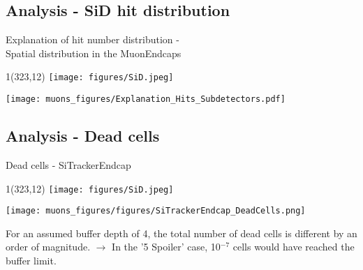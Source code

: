 \documentclass[xcolor={dvipsnames}]{beamer}
\newcommand{\sidlogo}{
  \setlength{\TPHorizModule}{1pt}
  \setlength{\TPVertModule}{1pt}
  \begin{textblock}{1}(323,12)
   \texttt{[image: figures/SiD.jpeg]}
  \end{textblock}
  }
\begin{document}
\subsection{Analysis - SiD hit distribution}
\begin{frame}{Explanation of hit number distribution -\\ \small Spatial distribution in the MuonEndcaps}
\sidlogo
 \begin{center}
\texttt{[image: muons\_figures/Explanation\_Hits\_Subdetectors.pdf]}
\end{center}
\end{frame}

\subsection{Analysis - Dead cells}
\begin{frame}{Dead cells - \small SiTrackerEndcap}
\sidlogo
 \begin{center}
\texttt{[image: muons\_figures/figures/SiTrackerEndcap\_DeadCells.png]}
\end{center}
\small For an assumed buffer depth of 4, the total number of dead cells is different by an order of magnitude. $\rightarrow$ In the '5 Spoiler' case, 10$^{-7}$ cells would have reached the buffer limit.
\end{frame}
\end{document}
